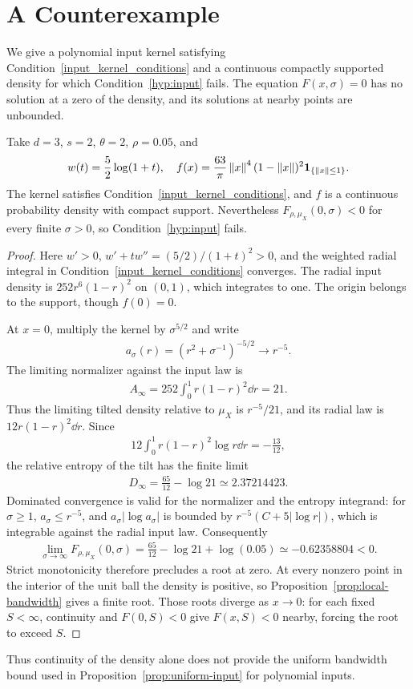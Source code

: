 \clearpage

\section{A Counterexample}\label{sec:calibration-counterexample}
We give a polynomial input kernel satisfying Condition~\ref{input_kernel_conditions} and a continuous compactly supported density for which Condition~\ref{hyp:input} fails. The equation $F(x,\sigma)=0$ has no solution at a zero of the density, and its solutions at nearby points are unbounded.
\begin{example}\label{ex:calibration-failure}
Take $d=3$, $s=2$, $\theta=2$, $\rho=0.05$, and
\begin{align}
w(t)=\frac52\log(1+t),\quad
f(x)=\frac{63}{\pi}\left\lVert x\right\rVert^4(1-\left\lVert x\right\rVert)^2\mathbf 1_{\{\left\lVert x\right\rVert\leq1\}}.
\end{align}
The kernel satisfies Condition~\ref{input_kernel_conditions}, and $f$ is a continuous probability density with compact support. Nevertheless $F_{\rho,\mu_X}(0,\sigma)<0$ for every finite $\sigma>0$, so Condition~\ref{hyp:input} fails.
\end{example}
\begin{proof}
Here $w'>0$, $w'+tw''=(5/2)/(1+t)^2>0$, and the weighted radial integral in Condition~\ref{input_kernel_conditions} converges. The radial input density is $252r^6(1-r)^2$ on $(0,1)$, which integrates to one. The origin belongs to the support, though $f(0)=0$.

At $x=0$, multiply the kernel by $\sigma^{5/2}$ and write
\begin{align}
a_\sigma(r)=(r^2+\sigma^{-1})^{-5/2}\longrightarrow r^{-5}.
\end{align}
The limiting normalizer against the input law is
\begin{align}
A_\infty=252\int_0^1r(1-r)^2\dd r=21.
\end{align}
Thus the limiting tilted density relative to $\mu_X$ is $r^{-5}/21$, and its radial law is $12r(1-r)^2\dd r$. Since
\begin{align}
12\int_0^1r(1-r)^2\log r\dd r=-\frac{13}{12},
\end{align}
the relative entropy of the tilt has the finite limit
\begin{align}
D_\infty=\frac{65}{12}-\log21\simeq2.37214423.
\end{align}
Dominated convergence is valid for the normalizer and the entropy integrand: for $\sigma\geq1$, $a_\sigma\leq r^{-5}$, and $a_\sigma|\log a_\sigma|$ is bounded by $r^{-5}(C+5|\log r|)$, which is integrable against the radial input law. Consequently
\begin{align}
\lim_{\sigma\to\infty}F_{\rho,\mu_X}(0,\sigma)
=\frac{65}{12}-\log21+\log(0.05)
\simeq-0.62358804<0.
\end{align}
Strict monotonicity therefore precludes a root at zero. At every nonzero point in the interior of the unit ball the density is positive, so Proposition~\ref{prop:local-bandwidth} gives a finite root. Those roots diverge as $x\to0$: for each fixed $S<\infty$, continuity and $F(0,S)<0$ give $F(x,S)<0$ nearby, forcing the root to exceed $S$.
\end{proof}
Thus continuity of the density alone does not provide the uniform bandwidth bound used in Proposition~\ref{prop:uniform-input} for polynomial inputs.

\endgroup
